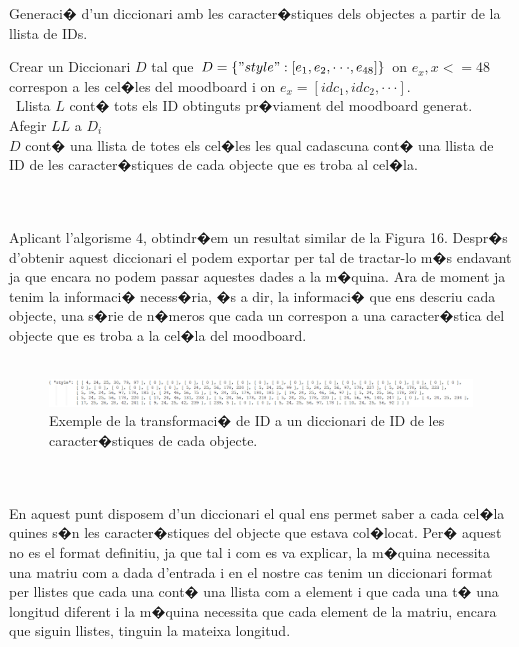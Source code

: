 \documentclass[12pt,a4paper,openright,oneside]{article}
\numberwithin{equation}{section}
\theoremstyle{definition}
\begin{document}
\begin{algorithm}
\caption{Generaci� d'un diccionari amb les caracter�stiques dels objectes a partir de la llista de IDs.}
\begin{algorithmic} 
\STATE Crear un Diccionari ${D}$ tal que ${D = \{"style": [e_1, e_2, \cdot \cdot \cdot, e_{48}]\}}$ on ${e_x, x <= 48}$ correspon a les cel�les del moodboard i on ${e_x = [idc_1,idc_2, \cdot \cdot \cdot]}$.\\\ Llista ${L}$ cont� tots els ID obtinguts pr�viament del moodboard generat.
\ENDFOR
\\ Afegir ${LL}$ a ${D_i}$
\ENDFOR \\
${D}$ cont� una llista de totes els cel�les les qual cadascuna cont� una llista de ID de les caracter�stiques de cada objecte que es troba  al cel�la.
\end{algorithmic}
\end{algorithm}
\\\\Aplicant l'algorisme 4, obtindr�em un resultat similar de la Figura 16. Despr�s d'obtenir aquest diccionari el podem exportar per tal de tractar-lo m�s endavant ja que encara no podem passar aquestes dades a la m�quina. Ara de moment ja tenim la informaci� necess�ria, �s a dir, la informaci� que ens descriu cada objecte, una s�rie de n�meros que cada un correspon a una caracter�stica del objecte que es troba a la cel�la del moodboard.
\\\\
\begin{figure}[h!]
\begin{center}
\includegraphics[width=\textwidth]{id_c}
\caption{Exemple de la transformaci� de ID a un diccionari de ID de les caracter�stiques de cada objecte.}
\end{center}
\end{figure}
\\\\
En aquest punt disposem d'un diccionari el qual ens permet saber a cada cel�la quines s�n les caracter�stiques del objecte que estava col�locat. Per� aquest no es el format definitiu, ja que tal i com es va explicar, la m�quina necessita una matriu com a dada d'entrada i en el nostre cas tenim un diccionari format per llistes que cada una cont� una llista com a element i que cada una t� una longitud diferent i la m�quina necessita que cada element de la matriu, encara que siguin llistes, tinguin la mateixa longitud. \\\\
\end{document}
